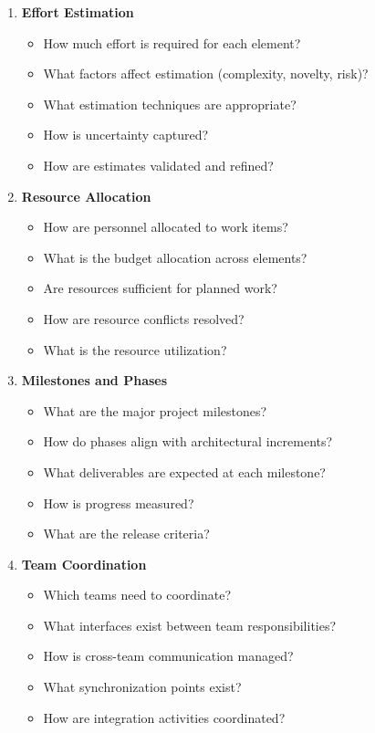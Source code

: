 \documentclass[11pt,letterpaper]{article}
\begin{document}
\begin{enumerate}[label=\textbf{C\arabic*:}, leftmargin=2.5em]
    \item \textbf{Effort Estimation}
    \begin{itemize}[nosep]
        \item How much effort is required for each element?
        \item What factors affect estimation (complexity, novelty, risk)?
        \item What estimation techniques are appropriate?
        \item How is uncertainty captured?
        \item How are estimates validated and refined?
    \end{itemize}
    
    \item \textbf{Resource Allocation}
    \begin{itemize}[nosep]
        \item How are personnel allocated to work items?
        \item What is the budget allocation across elements?
        \item Are resources sufficient for planned work?
        \item How are resource conflicts resolved?
        \item What is the resource utilization?
    \end{itemize}
    
    \item \textbf{Milestones and Phases}
    \begin{itemize}[nosep]
        \item What are the major project milestones?
        \item How do phases align with architectural increments?
        \item What deliverables are expected at each milestone?
        \item How is progress measured?
        \item What are the release criteria?
    \end{itemize}
    
    \item \textbf{Team Coordination}
    \begin{itemize}[nosep]
        \item Which teams need to coordinate?
        \item What interfaces exist between team responsibilities?
        \item How is cross-team communication managed?
        \item What synchronization points exist?
        \item How are integration activities coordinated?
    \end{itemize}
    

\end{enumerate}
\end{document}
